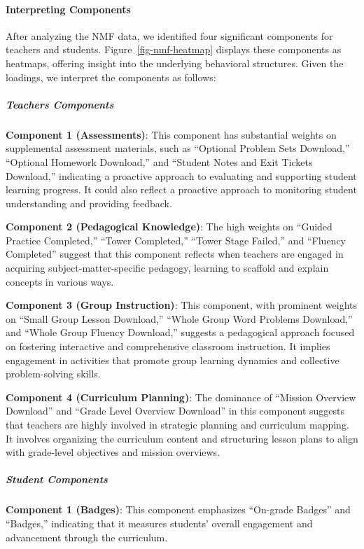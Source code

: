 \documentclass[
  number,
  preprint,
  3p,
  onecolumn]{elsarticle}
\let\oldparagraph\paragraph
\renewcommand{\paragraph}[1]{\oldparagraph{#1}\mbox{}}
\let\oldsubparagraph\subparagraph
\renewcommand{\subparagraph}[1]{\oldsubparagraph{#1}\mbox{}}
\begin{document}
\paragraph{Interpreting Components}\label{interpreting-components}

After analyzing the NMF data, we identified four significant components
for teachers and students. Figure~\ref{fig-nmf-heatmap} displays these
components as heatmaps, offering insight into the underlying behavioral
structures. Given the loadings, we interpret the components as follows:

\subparagraph{Teachers Components}\label{teachers-components}

\textbf{Component 1 (Assessments)}: This component has substantial
weights on supplemental assessment materials, such as ``Optional Problem
Sets Download,'' ``Optional Homework Download,'' and ``Student Notes and
Exit Tickets Download,'' indicating a proactive approach to evaluating
and supporting student learning progress. It could also reflect a
proactive approach to monitoring student understanding and providing
feedback.

\textbf{Component 2 (Pedagogical Knowledge)}: The high weights on
``Guided Practice Completed,'' ``Tower Completed,'' ``Tower Stage
Failed,'' and ``Fluency Completed'' suggest that this component reflects
when teachers are engaged in acquiring subject-matter-specific pedagogy,
learning to scaffold and explain concepts in various ways.

\textbf{Component 3 (Group Instruction)}: This component, with prominent
weights on ``Small Group Lesson Download,'' ``Whole Group Word Problems
Download,'' and ``Whole Group Fluency Download,'' suggests a pedagogical
approach focused on fostering interactive and comprehensive classroom
instruction. It implies engagement in activities that promote group
learning dynamics and collective problem-solving skills.

\textbf{Component 4 (Curriculum Planning)}: The dominance of ``Mission
Overview Download'' and ``Grade Level Overview Download'' in this
component suggests that teachers are highly involved in strategic
planning and curriculum mapping. It involves organizing the curriculum
content and structuring lesson plans to align with grade-level
objectives and mission overviews.

\subparagraph{Student Components}\label{student-components}

\textbf{Component 1 (Badges)}: This component emphasizes ``On-grade
Badges'' and ``Badges,'' indicating that it measures students' overall
engagement and advancement through the curriculum.
\end{document}
